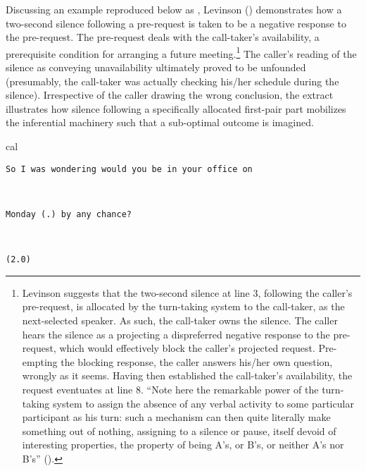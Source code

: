 \documentclass[output=paper,nonflat,colorlinks,citecolor=brown]{langsci/langscibook}
\begin{document}
Discussing an example reproduced below as , Levinson (\citeyear[320-321]{Levinson1983}) demonstrates how a two-second silence following a pre-request is taken to be a negative response to the pre-request. The pre-request deals with the call-taker’s availability, a prerequisite condition for arranging a future meeting.\footnote{Levinson suggests that the two-second silence at line 3, following the caller’s pre-request, is allocated by the turn-taking system to the call-taker, as the next-selected speaker. As such, the call-taker owns the silence. The caller hears the silence as a projecting a dispreferred negative response to the pre-request, which would effectively block the caller’s projected request. Pre-empting the blocking response, the caller answers his/her own question, wrongly as it seems. Having then established the call-taker’s availability, the request eventuates at line 8. “Note here the remarkable power of the turn-taking system to assign the absence of any verbal activity to some particular participant as his turn: such a mechanism can then quite literally make something out of nothing, assigning to a silence or pause, itself devoid of interesting properties, the property of being A’s, or B’s, or neither A’s nor B’s” (\citealt[321]{Levinson1983}).}  The caller’s reading of the silence as conveying unavailability ultimately proved to be unfounded (presumably, the call-taker was actually checking his/her schedule during the silence). Irrespective of the caller drawing the wrong conclusion, the extract illustrates how silence following a specifically allocated first-pair part mobilizes the inferential machinery such that a sub-optimal outcome is imagined.


\begin{transbox}{1}{cal}
\begin{verbatim}
So I was wondering would you be in your office on
\end{verbatim}
\end{transbox}

\begin{transbox}{2}{~}
\begin{verbatim}
Monday (.) by any chance?
\end{verbatim}
\end{transbox}

\begin{transbox}{3}{~}
\begin{verbatim}
(2.0)
\end{verbatim}
\end{transbox}
\end{document}
